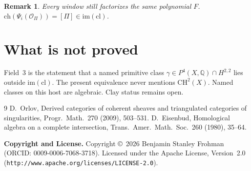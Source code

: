 \documentclass[11pt]{amsart}
\newtheorem{remark}{Remark}
\newcommand{\QQ}{\mathbb{Q}}
\begin{document}
\begin{remark}
Every window still factorizes the same polynomial $F$. $\mathrm{ch}(\Psi_i(\mathcal{O}_\Pi))=[
\Pi]\in\mathrm{im}(\mathrm{cl})$.
\end{remark}

\section{What is not proved}
Field~3 is the statement that a named primitive class $\gamma\in P^4(X,\QQ)\cap H^{2,2}$ lies outside $\mathrm{im}(\mathrm{cl})$. The present equivalence never mentions $\mathrm{CH}^2(X)$. Named classes on this host are algebraic. Clay status remains open.

\begin{thebibliography}{9}
 D.~Orlov, Derived categories of coherent sheaves and triangulated categories of singularities, Progr.\ Math.\ 270 (2009), 503--531.
 D.~Eisenbud, Homological algebra on a complete intersection, Trans.\ Amer.\ Math.\ Soc.\ 260 (1980), 35--64.
\end{thebibliography}

\bigskip\noindent\textbf{Copyright and License.} Copyright \copyright\ 2026 Benjamin Stanley Frohman (ORCID: 0009-0006-7068-3718). Licensed under the Apache License, Version~2.0 (\texttt{http://www.apache.org/licenses/LICENSE-2.0}).
\end{document}
